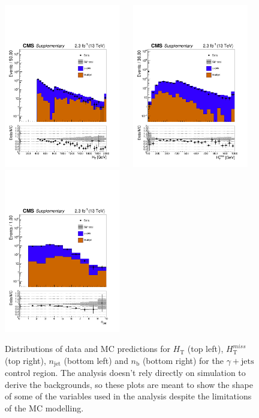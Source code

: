 \clearpage
\begin{figure}[tbhp]
    \caption{ 
    Distributions of data and MC predictions for $H_{\mathrm{T}}$ (top left), $H_{\mathrm{T}}^{miss}$ (top right), $n_{\mathrm{jet}}$ (bottom left) and $n_{\mathrm{b}}$ (bottom right) 
    for the $\gamma+\mathrm{jets}$ control region. 
    The analysis doesn't rely directly on simulation to derive the backgrounds, 
    so these plots are meant to show the shape of some of the variables used in the analysis despite the limitations 
    of the MC modelling. 
    \label{fig:data-MC_plots_SinglePhoton} }
  \begin{center}
     \includegraphics[width=0.45\textwidth]{SinglePhoton_ht40_all_all_aux} ~~
     \includegraphics[width=0.45\textwidth]{SinglePhoton_mht40_pt_all_all_aux} \\
     \includegraphics[width=0.45\textwidth]{SinglePhoton_nJet40_all_all_aux} ~~

\end{center}
\end{figure}
